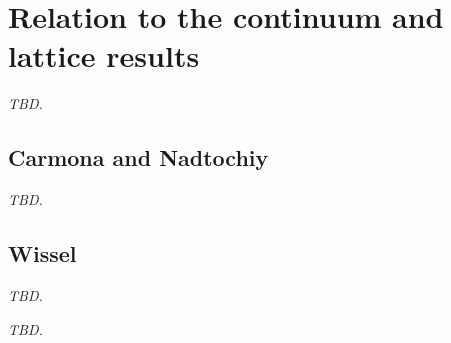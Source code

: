\section{Relation to the continuum and lattice results}\label{app:priority}

\emph{TBD.}

\subsection{Carmona and Nadtochiy}\label{app:cn}

\emph{TBD.}

\subsection{Wissel}\label{app:wissel}

\emph{TBD.}

\begin{remark}\label{rem:pinning}
\emph{TBD.}
\end{remark}
